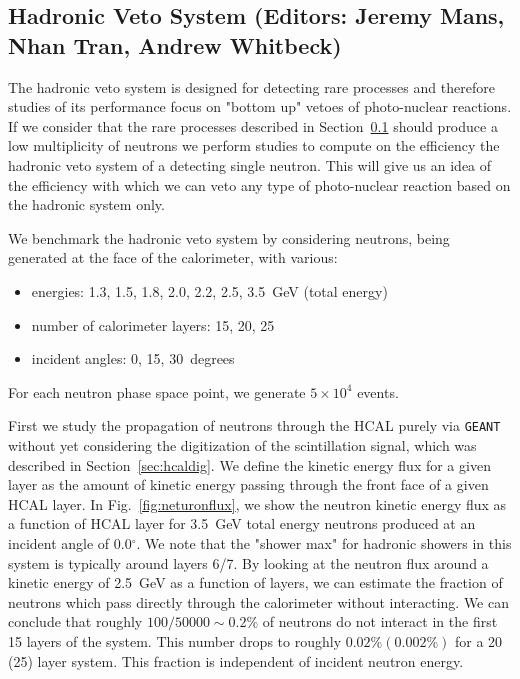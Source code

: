 
\subsection{Hadronic Veto System (Editors: Jeremy Mans, Nhan Tran, Andrew Whitbeck)}

The hadronic veto system is designed for detecting rare processes and therefore studies of its performance focus on "bottom up" vetoes of photo-nuclear reactions.  
If we consider that the rare processes described in Section~\ref{} should produce a low multiplicity of neutrons we perform studies to compute on the efficiency the hadronic veto system 
of a detecting single neutron.  
This will give us an idea of the efficiency with which we can veto any type of photo-nuclear reaction based on the hadronic system only.  

We benchmark the hadronic veto system by considering neutrons, being generated at the face of the calorimeter, with various:
\begin{itemize}
\item energies: 1.3, 1.5, 1.8, 2.0, 2.2, 2.5, 3.5~GeV (total energy)
\item number of calorimeter layers: 15, 20, 25
\item incident angles: 0, 15, 30~degrees
\end{itemize}
For each neutron phase space point, we generate $5 \times 10^4$ events.  

First we study the propagation of neutrons through the HCAL purely via {\tt GEANT} without yet considering the digitization of the scintillation signal, which was described in Section~\ref{sec:hcaldig}.
We define the kinetic energy flux for a given layer as the amount of kinetic energy passing through the front face of a given HCAL layer.  
In Fig.~\ref{fig:neturonflux}, we show the neutron kinetic energy flux as a function of HCAL layer for 3.5~GeV total energy neutrons produced at an incident angle of 0.0$^{\circ}$.
We note that the "shower max" for hadronic showers in this system is typically around layers 6/7.  
By looking at the neutron flux around a kinetic energy of 2.5~GeV as a function of layers, we can estimate the fraction of neutrons which pass directly through the calorimeter without interacting.  
We can conclude that roughly $100/50000 \sim 0.2\%$ of neutrons do not interact in the first 15 layers of the system.
This number drops to roughly $0.02\% (0.002\%)$ for a 20 (25) layer system.
This fraction is independent of incident neutron energy.

